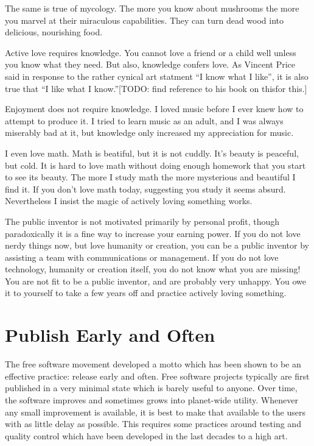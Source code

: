 \documentclass[
	fontsize=10pt, %
	twoside=false, %
	secnumdepth=1, %
]{kaobook}
\begin{document}
The same is true of mycology. The more you know about mushrooms
the more you marvel at their miraculous capabilities.
They can turn dead wood into delicious, nourishing food.

Active love requires knowledge. You cannot love a friend or a child
well unless you know what they need. But also, knowledge
confers love. As Vincent Price said in response to the
rather cynical art statment ``I know what I like'', it is
also true that ``I like what I know.''[TODO: find reference to his book on thisfor this.]

Enjoyment does not require knowledge. I loved music before
I ever knew how to attempt to produce it. I tried to learn music as an adult,
and I was always miserably bad at it, but knowledge only increased my appreciation for music.

I even love math. Math is beatiful, but it is not cuddly. It's beauty is peaceful, but cold.
It is hard to love math without doing enough homework that you start to see its beauty.
The more I study math the more mysterious and beautiful I find it.
If you don't love math today, suggesting you study it seems absurd.
Nevertheless I insist the magic of actively loving something works.

The public inventor is not motivated primarily by personal profit,
though paradoxically it is a fine way to increase your earning power.
If you do not love nerdy things now, but love humanity or creation, you can
be a public inventor by assisting a team with communications or management.
If you do not love technology, humanity or creation itself,
you do not know what you are missing!
You are not fit to be a public inventor, and
are probably very unhappy.
You owe it to yourself to take a few years off and practice actively loving something.

\section{Publish Early and Often}

The free software movement developed a motto which has been shown to be an
effective practice: release early and often.
Free software projects typically are first published in a very minimal state
which is barely useful to anyone.
Over time, the software improves and sometimes grows into planet-wide utility.
Whenever any small improvement is available, it is best to make that
available to the users with as little delay as possible.
This requires some practices around testing and quality control which have
been developed in the last decades to a high art.
\end{document}
